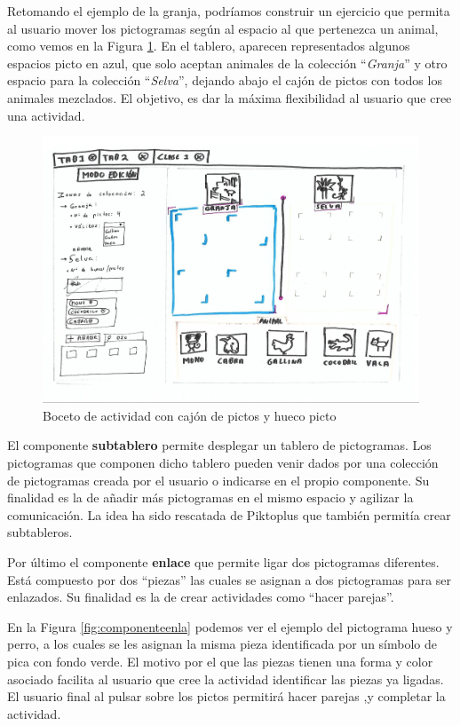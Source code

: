 Retomando el ejemplo de la granja, podríamos construir un ejercicio que permita al usuario mover los pictogramas según al espacio al que pertenezca un animal, como vemos en la Figura \ref{fig:cajonpictosgranja}. En el tablero, aparecen representados algunos espacios picto en azul, que solo aceptan animales de la colección “\textit{Granja}” y otro espacio para la colección “\textit{Selva}”, dejando abajo el cajón de pictos con todos los animales mezclados. El objetivo, es dar la máxima flexibilidad al usuario que cree una actividad.

\begin{figure}[h!]
	\centering
	\includegraphics[width=0.7\linewidth]{Imagenes/Bitmap/cajonPictosGranja}
	\caption{Boceto de actividad con cajón de pictos y hueco picto}
	\label{fig:cajonpictosgranja}
\end{figure}

El componente \textbf{subtablero} permite desplegar un tablero de pictogramas. Los pictogramas que componen dicho tablero pueden venir dados por una colección de pictogramas creada por el usuario o indicarse en el propio componente. Su finalidad es la de añadir más pictogramas en el mismo espacio y agilizar la comunicación. La idea ha sido rescatada de Piktoplus que también permitía crear subtableros.


Por último el componente \textbf{enlace} que permite ligar dos pictogramas diferentes. Está compuesto por dos “piezas” las cuales se asignan a dos pictogramas para ser enlazados. Su finalidad es la de crear actividades como “hacer parejas”.

En la Figura \ref{fig:componenteenla} podemos ver el ejemplo del pictograma hueso y perro, a los cuales se les asignan la misma pieza identificada por un símbolo de pica con fondo verde. El motivo por el que  las piezas tienen una forma y color asociado facilita al usuario que cree la actividad identificar las piezas ya  ligadas. El usuario final al pulsar sobre los pictos permitirá hacer parejas ,y completar la actividad.


